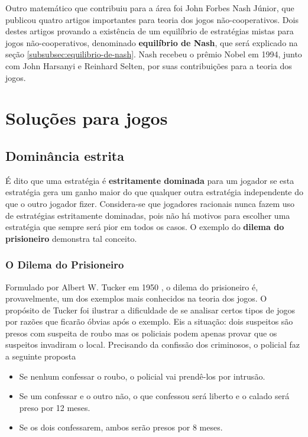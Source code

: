 Outro matemático que contribuiu para a área foi John Forbes Nash Júnior, que publicou quatro artigos importantes para teoria dos jogos não-cooperativos. Dois destes artigos \cite{nash_1950} \cite{nash_1951} provando a existência de um equilíbrio de estratégias mistas para jogos não-cooperativos, denominado \textbf{equilíbrio de Nash}, que será explicado na seção \ref{subsubsec:equilibrio-de-nash}. Nash recebeu o prêmio Nobel em 1994, junto com John Harsanyi e Reinhard Selten, por suas contribuições para a teoria dos jogos.
\section{Soluções para jogos}
\subsection{Dominância estrita}

É dito que uma estratégia é {\bfseries estritamente dominada} para um jogador se esta estratégia gera um ganho maior do que qualquer outra estratégia independente do que o outro jogador fizer. Considera-se que jogadores racionais nunca fazem uso de estratégias estritamente dominadas, pois não há motivos para escolher uma estratégia que sempre será pior em todos os casos. O exemplo do {\bfseries dilema do prisioneiro} demonstra tal conceito.

\subsubsection{O Dilema do Prisioneiro}
Formulado por Albert W. Tucker em 1950 \cite{sartini_IIbienaldasbm}, o dilema do prisioneiro é, provavelmente, um dos exemplos mais conhecidos na teoria dos jogos. O propósito de Tucker foi ilustrar a dificuldade de se analisar certos tipos de jogos por razões que ficarão óbvias após o exemplo. Eis a situação: dois suspeitos são presos com suspeita de roubo mas os policiais podem apenas provar que os suspeitos invadiram o local. Precisando da confissão dos criminosos, o policial faz a seguinte proposta
\begin{itemize}
	\item Se nenhum confessar o roubo, o policial vai prendê-los por intrusão.
	\item Se um confessar e o outro não, o que confessou será liberto e o calado será preso por 12 meses.
	\item Se os dois confessarem, ambos serão presos por 8 meses.
\end{itemize}


